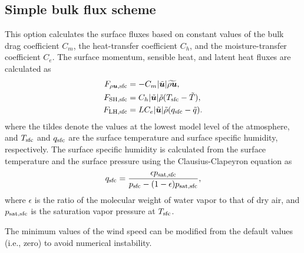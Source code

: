 \subsection{Simple bulk flux scheme}\label{ssec:simple_sfcflux_bulk}
This option calculates the surface fluxes 
based on constant values of the bulk drag coefficient $C_m$, the heat-transfer coefficient $C_h$, and the moisture-transfer coefficient $C_e$.
The surface momentum, sensible heat, and latent heat fluxes are calculated as
\begin{align}
  F_{\rho \bm{u},{\rm sfc}} &= -C_m |\tilde{\bm{u}}| \widetilde{\rho \bm{u}},\\
  F_{{\rm SH, sfc}} &= C_h |\tilde{\bm{u}}| \tilde{\rho} (T_{\rm sfc} - \tilde{T}),\\
  F_{{\rm LH, sfc}} &= L C_e |\tilde{\bm{u}}| \tilde{\rho} (q_{\rm sfc} - \tilde{q}).
\end{align}
where the tildes denote the values at the lowest model level of the atmosphere, 
and $T_{\rm sfc}$ and $q_{\rm sfc}$ are the surface temperature and surface specific humidity, respectively.
The surface specific humidity is calculated from the surface temperature and the surface pressure using the Clausius-Clapeyron equation as
\begin{align}
  q_{\rm sfc} = \dfrac{\epsilon p_{\rm sat,sfc}}{p_{\rm sfc} - (1-\epsilon) p_{\rm sat,sfc}},
\end{align}
where $\epsilon$ is the ratio of the molecular weight of water vapor to that of dry air,
and $p_{\rm sat,sfc}$ is the saturation vapor pressure at $T_{\rm sfc}$.

The minimum values of the wind speed can be modified from the default values (i.e., zero) to avoid numerical instability.
